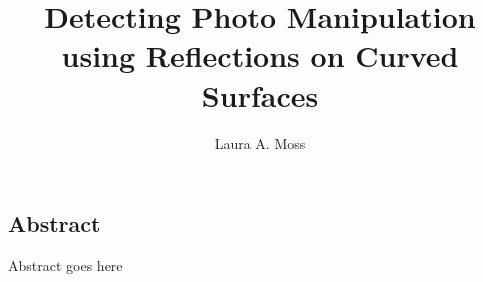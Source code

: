 \title{Detecting Photo Manipulation using Reflections on Curved Surfaces}
\author{Laura A. Moss}
\date{}
\maketitle

\newpage

\subsection*{Abstract}
Abstract goes here
